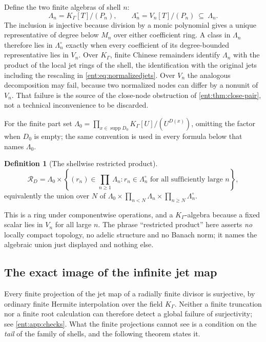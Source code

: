 \documentclass[11pt]{article}
\theoremstyle{plain}
\theoremstyle{plain}
\theoremstyle{plain}
\theoremstyle{definition}
\newtheorem{definition}[definition]{Definition}
\theoremstyle{definition}
\theoremstyle{definition}
\theoremstyle{definition}
\theoremstyle{remark}
\newcommand{\K}{K_\Gamma}\newcommand{\KD}{K_\Delta}
\DeclareMathOperator{\supp}{supp}\DeclareMathOperator{\lc}{lc}
\newcommand{\RD}{\mathcal R_D}\newcommand{\Ucal}{\mathcal U}
\begin{document}
Define the two finite algebras of shell $n$:
\begin{equation}\label{ent:eq:shell-algebras}
 \Lambda_n=\K[T]/(P_n),
 \qquad
 \Lambda_n^\circ=V_n[T]/(P_n)\ \subseteq\ \Lambda_n .
\end{equation}
The inclusion is injective because division by a monic polynomial gives a
unique representative of degree below $M_n$ over either coefficient ring.
A class in $\Lambda_n$ therefore lies in $\Lambda_n^\circ$ exactly when every
coefficient of its degree-bounded representative lies in $V_n$. Over $\K$,
finite Chinese remainders identify $\Lambda_n$ with the product of the local
jet rings of the shell, the identification with the original jets including
the rescaling in \eqref{ent:eq:normalizedjets}. Over $V_n$ the analogous
decomposition may fail, because two normalized nodes can differ by a nonunit
of $V_n$. That failure is the source of the close-node obstruction of
\cref{ent:thm:close-pair}, not a technical inconvenience to be discarded.

For the finite part set $\Lambda_0=\prod_{x\in\supp D_0}\K[U]/(U^{D(x)})$,
omitting the factor when $D_0$ is empty; the same convention is used in every
formula below that names $\Lambda_0$.

\begin{definition}[The shellwise restricted product]\label{ent:def:restricted}
\begin{equation}\label{ent:eq:restricted}
 \RD=\Lambda_0\times
 \left\{(r_n)\in\prod_{n\ge1}\Lambda_n:
    r_n\in\Lambda_n^\circ\text{ for all sufficiently large }n\right\},
\end{equation}
equivalently the union over $N$ of
$\Lambda_0\times\prod_{n<N}\Lambda_n\times\prod_{n\ge N}\Lambda_n^\circ$.
\end{definition}

This is a ring under componentwise operations, and a $\K$-algebra because a
fixed scalar lies in $V_n$ for all large $n$. The phrase ``restricted
product'' here asserts \emph{no} locally compact topology, no adelic
structure and no Banach norm; it names the algebraic union just displayed and
nothing else.

\subsection{The exact image of the infinite jet map}
\label{ent:subsec:jet-image}
Every finite projection of the jet map of a radially finite divisor is
surjective, by ordinary finite Hermite interpolation over the field $\K$.
Neither a finite truncation nor a finite root calculation can therefore
detect a global failure of surjectivity; see \cref{ent:app:checks}. What the
finite projections cannot see is a condition on the \emph{tail} of the family
of shells, and the following theorem states it.
\end{document}
